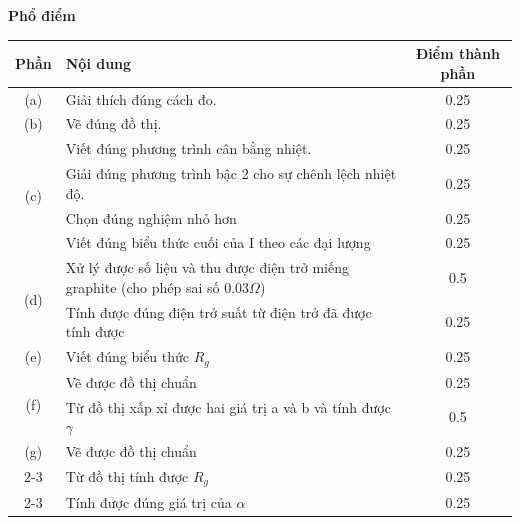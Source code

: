 \begin{enumerate}[label=(\alph*)]
\newpage
\textbf{Phổ điểm}
    \begin{center}
    \begin{tabular}{|c|p{8cm}|c|}
    \hline
    \multicolumn{1}{|l|}{Phần} & Nội dung & Điểm thành phần \\ 
    \hline
\multirow{1}{*}{(a)} & Giải thích đúng cách đo.                                                                                  & 0.25             
                                \\ \hline
\multirow{1}{*}{(b)} & Vẽ đúng đồ thị.                                                                                & 0.25             
                                \\ \hline
\multirow{4}{*}{(c)} & Viết đúng phương trình cân bằng nhiệt.                               
                     & 0.25            \\ \cline{2-3}
                     & Giải đúng phương trình bậc 2 cho sự chênh lệch nhiệt độ.         
                     & 0.25            \\ \cline{2-3}
                     & Chọn đúng nghiệm nhỏ hơn                
                     & 0.25            \\ \cline{2-3}
                     & Viết đúng biểu thức cuối của I theo các đại lượng              
                     & 0.25           
                     \\ \hline
\multirow{2}{*}{(d)} & Xử lý được số liệu và thu được điện trở miếng graphite (cho phép sai số $0.03\Omega$)                            
                     & 0.5            \\ \cline{2-3}
                     & Tính được đúng điện trở suất từ điện trở đã được tính được    
                     & 0.25             
                     \\ \hline
\multirow{1}{*}{(e)} & Viết đúng biểu thức $R_g$                                                                            & 0.25          
\\ \hline     
\multirow{2}{*}{(f)} & Vẽ được đồ thị chuẩn                                                                        & 0.25    \\ \cline{2-3}     
& Từ đồ thị xấp xỉ được hai giá trị a và b và tính được $\gamma$                                                   & 0.5  
                                \\ \hline
\multirow{1}{*}{(g)} & Vẽ được đồ thị chuẩn                                                                        & 0.25     \\ \cline{2-3}     
& Từ đồ thị tính được $R_g$                                                   
& 0.25     \\ \cline{2-3}
& Tính được đúng giá trị của $\alpha$                                                   
& 0.25     \\ \hline                                


    \end{tabular}
    \end{center}
\end{enumerate}